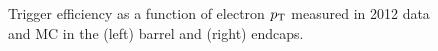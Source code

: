 \begin{figure}[h!]
\caption{Trigger efficiency as a function of electron $p_{\mathrm{T}}$ measured
in 2012 data and MC in the (left) barrel and (right) endcaps.}
\label{fig:electrontrg}
\end{figure}

